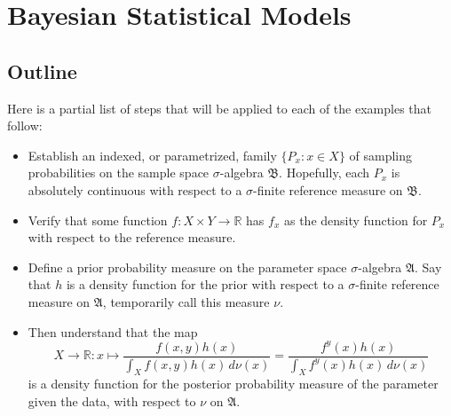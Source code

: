 \documentclass[
twoside=true,
paper=letter,
fontsize=11pt,
pagesize=auto,
leqno,
openany,
headsepline,
overfullrule,
]{scrbook}
\theoremstyle{plain}
\theoremstyle{plain}
\theoremstyle{definition}
\theoremstyle{bfnoteitalic}
\theoremstyle{bfnoteroman}
\newcommand{\sigalg}[1]{\mathfrak{#1}}
\newcommand{\textsigma}{\hbox{\large{$\sigma$}}\kern-1pt}
\newcommand{\R}{\mathbb{R}}
\newcommand{\funcf}{f}
\newcommand{\funch}{h}
\newcommand{\function}{f}
\newcommand{\functioniii}{h}
\newcommand{\measurespace}{X}
\newcommand{\measurespaceii}{Y}
\newcommand{\measureii}{\nu}
\newcommand{\measnu}{\nu}
\newcommand{\pspace}{\measurespace}%
\newcommand{\sspace}{\measurespaceii}%
\newcommand{\pspaceelt}{x}
\newcommand{\sspaceelt}{y}
\newcommand{\sspacesig}{\sigalg{B}}
\newcommand{\pspacesig}{\sigalg{A}}
\begin{document}
\chapter{Bayesian Statistical Models}\label{bayesian_statistical_models_examples}


\section{Outline}
Here is a partial list of steps that will be applied to each of the examples that follow:
\begin{itemize}
\item
Establish an indexed, or parametrized, family
$\{ P_\pspaceelt :\pspaceelt\in\pspace \}$
of sampling probabilities on the sample space \textsigma-algebra 
$\sspacesig$. Hopefully, each
$P_\pspaceelt$
is absolutely continuous with respect to a \textsigma-finite reference measure on $\sspacesig$.
\item
Verify that some function
$\function : \pspace\times\sspace\to\R$
has $\funcf_\pspaceelt$ as  the density function for
$P_\pspaceelt$ with respect to the reference measure.
\item
Define a prior probability measure on the parameter space \textsigma-algebra
$\pspacesig$.
Say that $\funch$ is a density function for the prior with respect to a \textsigma-finite reference measure on $\pspacesig$, temporarily call this measure $\measnu$.
\item
Then understand that the map
\[
\pspace\to\R:
\pspaceelt
\mapsto
\frac{\function(\pspaceelt,\sspaceelt)\functioniii(\pspaceelt)}
{\displaystyle
\int_{\pspace} \function(\pspaceelt,\sspaceelt)\functioniii(\pspaceelt)
\,d\measureii(\pspaceelt)}
=
\frac{\function^\sspaceelt(\pspaceelt)\functioniii(\pspaceelt)}
{\displaystyle
\int_{\pspace} \function^\sspaceelt(\pspaceelt)\functioniii(\pspaceelt)
\,d\measureii(\pspaceelt)}
\]
is a density function for the posterior probability measure of the parameter given the data,
with respect to $\measnu$ on $\pspacesig$.
\end{itemize}



\end{document}
